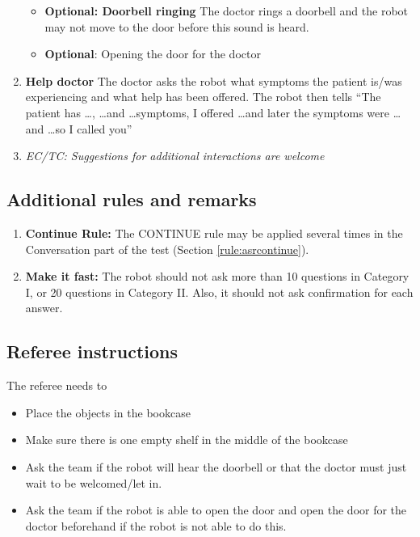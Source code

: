 \begin{enumerate}
\begin{itemize}
 \item \textbf{Optional: Doorbell ringing} The doctor rings a doorbell and the robot may not move to the door before this sound is heard.
 \item \textbf{Optional}: Opening the door for the doctor
\end{itemize}
\item \textbf{Help doctor} The doctor asks the robot what symptoms the patient is/was experiencing and what help has been offered.
The robot then tells ``The patient has \dots, \dots and \dots symptoms, I offered \dots and later the symptoms were \dots and \dots so I called you''
\item \textit{EC/TC: Suggestions for additional interactions are welcome}
\end{enumerate}


\subsection{Additional rules and remarks}
\begin{enumerate}
\item \textbf{Continue Rule:} The CONTINUE rule may be applied several times in the Conversation part of the test (Section \ref{rule:asrcontinue}).
\item \textbf{Make it fast:} The robot should not ask more than 10 questions in Category I, or 20 questions in Category II. Also, it should not ask confirmation for each answer.
\end{enumerate}

\subsection{Referee instructions}

The referee needs to
\begin{itemize}
\item Place the objects in the bookcase
\item Make sure there is one empty shelf in the middle of the bookcase
\item Ask the team if the robot will hear the doorbell or that the doctor must just wait to be welcomed/let in.
\item Ask the team if the robot is able to open the door and open the door for the doctor beforehand if the robot is not able to do this.
\end{itemize}

